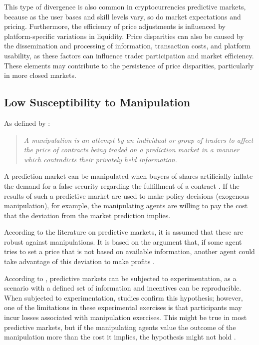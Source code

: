 This type of divergence is also common in cryptocurrencies predictive markets, because as the user bases and skill levels vary, so do market expectations and pricing. Furthermore, the efficiency of price adjustments is influenced by platform-specific variations in liquidity. Price disparities can also be caused by the dissemination and processing of information, transaction costs, and platform usability, as these factors can influence trader participation and market efficiency. These elements may contribute to the persistence of price disparities, particularly in more closed markets.

\subsection{Low Susceptibility to Manipulation}
\label{subsec:low_susceptibility_to_manipulation}

As defined by \cite{buckley2017effect}:
\begin{quote}
    \textit{A manipulation is an attempt by an individual or group of traders to affect the price of contracts being traded on a prediction market in a manner which contradicts their privately held information.}
\end{quote}
    
A prediction market can be manipulated when buyers of shares artificially inflate the demand for a false security regarding the fulfillment of a contract \parencite{choo2022manipulation}. If the results of such a predictive market are used to make policy decisions (exogenous manipulation), for example, the manipulating agents are willing to pay the cost that the deviation from the market prediction implies.
    
According to the literature on predictive markets, it is assumed that these are robust against manipulations. It is based on the argument that, if some agent tries to set a price that is not based on available information, another agent could take advantage of this deviation to make profits \parencite{buckley2017effect}.
    
According to \cite{HANSON2006449}, predictive markets can be subjected to experimentation, as a scenario with a defined set of information and incentives can be reproducible. When subjected to experimentation, studies confirm this hypothesis; however, one of the limitations in these experimental exercises is that participants may incur losses associated with manipulation exercises. This might be true in most predictive markets, but if the manipulating agents value the outcome of the manipulation more than the cost it implies, the hypothesis might not hold \parencite{deck2013affecting}.

